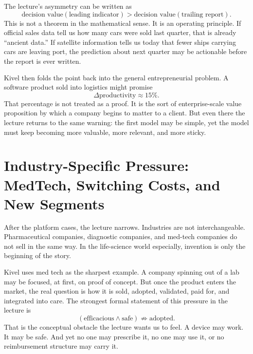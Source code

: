 The lecture's asymmetry can be written as
\begin{equation}
\text{decision value}(\text{leading indicator})
>
\text{decision value}(\text{trailing report}).
\end{equation}
This is not a theorem in the mathematical sense. It is an operating principle. If official sales data tell us how many cars were sold last quarter, that is already ``ancient data.'' If satellite information tells us today that fewer ships carrying cars are leaving port, the prediction about next quarter may be actionable before the report is ever written.

Kivel then folds the point back into the general entrepreneurial problem. A software product sold into logistics might promise
\begin{equation}
\Delta \text{productivity} \approx 15\%.
\end{equation}
That percentage is not treated as a proof. It is the sort of enterprise-scale value proposition by which a company begins to matter to a client. But even there the lecture returns to the same warning: the first model may be simple, yet the model must keep becoming more valuable, more relevant, and more sticky.

\section{Industry-Specific Pressure: MedTech, Switching Costs, and New Segments}

After the platform cases, the lecture narrows. Industries are not interchangeable. Pharmaceutical companies, diagnostic companies, and med-tech companies do not sell in the same way. In the life-science world especially, invention is only the beginning of the story.

Kivel uses med tech as the sharpest example. A company spinning out of a lab may be focused, at first, on proof of concept. But once the product enters the market, the real question is how it is sold, adopted, validated, paid for, and integrated into care. The strongest formal statement of this pressure in the lecture is
\begin{equation}
(\text{efficacious}\land \text{safe}) \not\Rightarrow \text{adopted}.
\end{equation}
That is the conceptual obstacle the lecture wants us to feel. A device may work. It may be safe. And yet no one may prescribe it, no one may use it, or no reimbursement structure may carry it.

